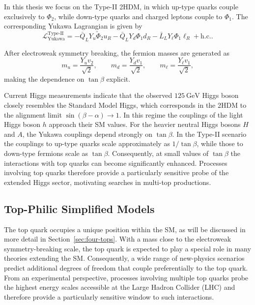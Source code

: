 In this thesis we focus on the Type-II 2HDM, in which up-type quarks
couple exclusively to $\Phi_2$, while down-type quarks and charged
leptons couple to $\Phi_1$.
The corresponding Yukawa Lagrangian is given by
\[
\mathcal{L}_\text{Yukawa}^{\text{Type-II}} =
- \bar{Q}_L Y_u \tilde{\Phi}_2 u_R
- \bar{Q}_L Y_d \Phi_1 d_R
- \bar{L}_L Y_\ell \Phi_1 \ell_R
+ \text{h.c.}.
\]

After electroweak symmetry breaking, the fermion masses are generated as
\[
m_u = \frac{Y_u v_2}{\sqrt{2}}, \qquad
m_d = \frac{Y_d v_1}{\sqrt{2}}, \qquad
m_\ell = \frac{Y_\ell v_1}{\sqrt{2}},
\]
making the dependence on $\tan\beta$ explicit.

Current Higgs measurements indicate that the observed
$125~\mathrm{GeV}$ Higgs boson closely resembles the Standard Model
Higgs, which corresponds in the 2HDM to the alignment limit
$\sin(\beta-\alpha) \to 1$.
In this regime the couplings of the light Higgs boson $h$ approach
their SM values.
For the heavier neutral Higgs bosons $H$ and $A$, the Yukawa
couplings depend strongly on $\tan\beta$.
In the Type-II scenario the couplings to up-type quarks scale
approximately as $1/\tan\beta$, while those to down-type fermions
scale as $\tan\beta$.
Consequently, at small values of $\tan\beta$ the interactions with
top quarks can become significantly enhanced.
Processes involving top quarks therefore provide a particularly
sensitive probe of the extended Higgs sector, motivating searches
in multi-top productions.

\subsection{Top-Philic Simplified Models}\label{subsec:S1/S8}

The top quark occupies a unique position within the SM, 
as will be discussed in more detail in Section~\ref{sec:four-tops}. 
With a mass close to the electroweak symmetry-breaking scale, the top quark 
is expected to play a special role in many theories extending the SM. 
Consequently, a wide range of new-physics scenarios predict additional 
degrees of freedom that couple preferentially to the top quark. 
From an experimental perspective, processes involving multiple top quarks 
probe the highest energy scales accessible at the Large Hadron Collider (LHC) 
and therefore provide a particularly sensitive window to such interactions.

